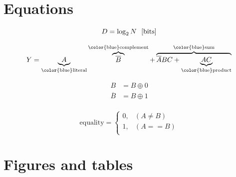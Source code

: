\section{Equations}
\label{sec:appendix.equations}
\begin{equation}
	\centering 
	D = \log_2 N\ \mbox{			[bits]}
	\label{eq:info}
\end{equation}

		\begin{equation*}
			Y = \underbrace{A}_\text{{\color{blue}literal}}\overbrace{\overline{B}}^\text{{\color{blue}complement}}+\overbrace{\overline{A}BC+\underbrace{AC}_\text{{\color{blue}product}}}^\text{{\color{blue}sum}}		
		\label{eq:boolean}
		\end{equation*}

\begin{equation}
\begin{split}
	B 			 &= B \oplus 0\\
	\overline{B} &= B \oplus 1\\
	\label{eq:truefalse}
\end{split}
\end{equation}	

\begin{equation}
		\text{equality}=
		\begin{cases}
			0, & (A \ne B) \\
			1, & (A == B) \\	
		\end{cases}
		\label{eq:equality}
\end{equation}	
\section{Figures and tables}
\label{sec:appendix.fig}

